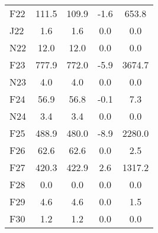 \documentclass[article,crop=false]{standalone}%
\begin{document}
\begin{tabular}[h]{l | c c c c}
\rowcolor{white}%
F22&111.5&109.9&{-}1.6&653.8\\%
\rowcolor{lightgray}%
J22&1.6&1.6&0.0&0.0\\%
\rowcolor{white}%
N22&12.0&12.0&0.0&0.0\\%
\rowcolor{lightgray}%
F23&777.9&772.0&{-}5.9&3674.7\\%
\rowcolor{white}%
N23&4.0&4.0&0.0&0.0\\%
\rowcolor{lightgray}%
F24&56.9&56.8&{-}0.1&7.3\\%
\rowcolor{white}%
N24&3.4&3.4&0.0&0.0\\%
\rowcolor{lightgray}%
F25&488.9&480.0&{-}8.9&2280.0\\%
\rowcolor{white}%
F26&62.6&62.6&0.0&2.5\\%
\rowcolor{lightgray}%
F27&420.3&422.9&2.6&1317.2\\%
\rowcolor{white}%
F28&0.0&0.0&0.0&0.0\\%
\rowcolor{lightgray}%
F29&4.6&4.6&0.0&1.5\\%
\rowcolor{white}%
F30&1.2&1.2&0.0&0.0\\%
\hline%
\end{tabular}%
\end{document}
